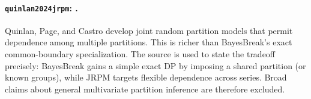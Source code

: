 
\paragraph{\texttt{quinlan2024jrpm}: \citet{quinlan2024jrpm}.}
Quinlan, Page, and Castro develop joint random partition models that permit dependence among multiple partitions. This is richer than BayesBreak's exact common-boundary specialization. The source is used to state the tradeoff precisely: BayesBreak gains a simple exact DP by imposing a shared partition (or known groups), while JRPM targets flexible dependence across series. Broad claims about general multivariate partition inference are therefore excluded.
